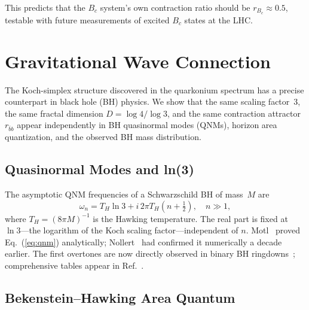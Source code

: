 \documentclass[twocolumn,showpacs,preprintnumbers,amsmath,amssymb,prl]{revtex4-2}
\begin{document}
This predicts that the $B_c$ system's own contraction ratio should be
$r_{B_c} \approx 0.5$, testable with future measurements of excited
$B_c$ states at the LHC.

\section{Gravitational Wave Connection}
\label{sec:gw}

The Koch-simplex structure discovered in the quarkonium spectrum has a
precise counterpart in black hole (BH) physics. We show that the same
scaling factor~3, the same fractal dimension
$D = \log 4/\log 3$, and the same contraction attractor $r_{\bar{b}b}$
appear independently in BH quasinormal modes (QNMs), horizon area
quantization, and the observed BH mass distribution.

\subsection{Quasinormal Modes and ln(3)}

The asymptotic QNM frequencies of a Schwarzschild BH of mass~$M$ are~\cite{Nollert1993,Hod1998,Motl2003}
\begin{equation}
    \omega_n = T_H \ln 3 + i\,2\pi T_H\!\left(n + \tfrac{1}{2}\right),
    \quad n \gg 1,
    \label{eq:qnm}
\end{equation}
where $T_H = (8\pi M)^{-1}$ is the Hawking temperature.
The real part is fixed at $\ln 3$---the logarithm of the Koch scaling
factor---independent of $n$. Motl~\cite{Motl2003} proved
Eq.~(\ref{eq:qnm}) analytically; Nollert~\cite{Nollert1993} had
confirmed it numerically a decade earlier. The first overtones are
now directly observed in binary BH ringdowns~\cite{Isi2019};
comprehensive tables appear in Ref.~\cite{Berti2009}.

\subsection{Bekenstein--Hawking Area Quantum}
\end{document}

